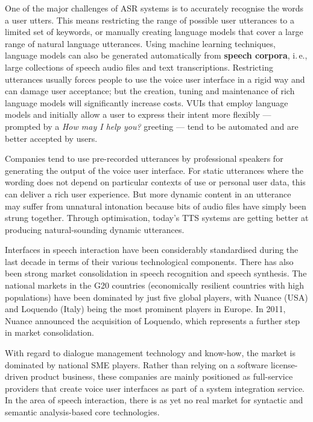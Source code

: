 \documentclass[]{../../metanetpaper}
\begin{document}
\begin{multicols}{2}
One of the major challenges of ASR systems is to accurately recognise the words a user utters. This means restricting the range of possible user utterances to a limited set of keywords, or manually creating language models that cover a large range of natural language utterances. Using machine learning techniques, language models can also be generated automatically from \textbf{speech corpora}, i.\,e., large collections of speech audio files and text transcriptions. Restricting utterances usually forces people to use the voice user interface in a rigid way and can damage user acceptance; but the creation, tuning and maintenance of rich language models will significantly increase costs. VUIs that employ language models and initially allow a user to express their intent more flexibly — prompted by a \textit{How may I help you?} greeting — tend to be automated and are better accepted by users.


Companies tend to use pre-recorded utterances by professional speakers for generating the output of the voice user interface. For static utterances where the wording does not depend on particular contexts of use or personal user data, this can deliver a rich user experience. But more dynamic content in an utterance may suffer from unnatural intonation because bits of audio files have simply been strung together. Through optimisation, today’s TTS systems are getting better at producing natural-sounding dynamic utterances.

Interfaces in speech interaction have been considerably standardised during the last decade in terms of their various technological components. There has also been strong market consolidation in speech recognition and speech synthesis. The national markets in the G20 countries (economically resilient countries with high populations) have been dominated by just five global players, with Nuance (USA) and Loquendo (Italy) being the most prominent players in Europe. In 2011, Nuance announced the acquisition of Loquendo, which represents a further step in market consolidation.

With regard to dialogue management technology and know-how, the market is dominated by national SME players. Rather than relying on a software license-driven product business, these companies are mainly positioned as full-service providers that create voice user interfaces as part of a system integration service. In the area of speech interaction, there is as yet no real market for syntactic and semantic analysis-based core technologies.


\end{multicols}
\end{document}
